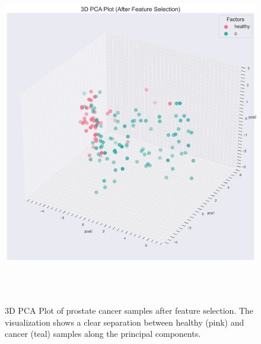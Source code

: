\documentclass[journal]{IEEEtran}
\begin{document}
\begin{figure}[htbp]
 \centering
 \includegraphics[width=\linewidth]{prostate_cancer_figures/clustering/after_feature_selection/3D_pca_plot.png}
 \caption{3D PCA Plot of prostate cancer samples after feature selection. The visualization shows a clear separation between healthy (pink) and cancer (teal) samples along the principal components.}
 \label{fig:prostate_pca}
\end{figure}
\end{document}

